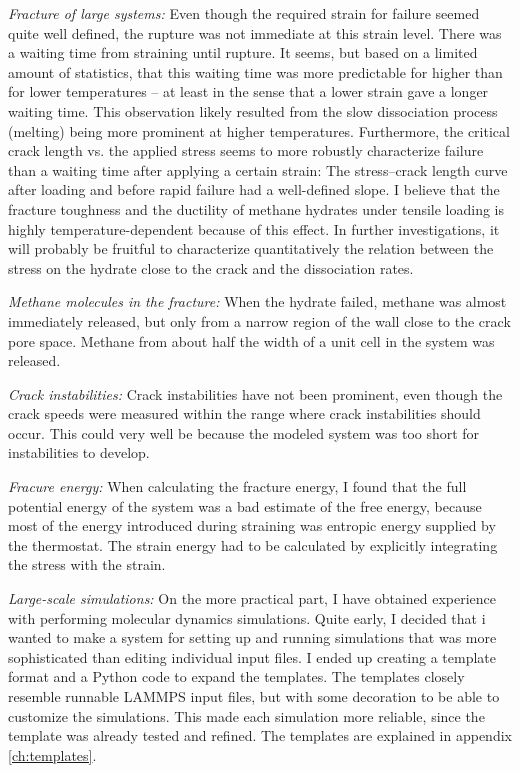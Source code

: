 \textit{Fracture of large systems:} Even though the required strain for failure seemed quite well defined, the rupture was not immediate at this strain level. There was a waiting time from straining until rupture. It seems, but based on a limited amount of statistics, that this waiting time was more predictable for higher than for lower temperatures -- at least in the sense that a lower strain gave a longer waiting time. This observation likely resulted from the slow dissociation process (melting) being more prominent at higher temperatures.  Furthermore, the critical crack length vs. the applied stress seems to more robustly characterize failure than a waiting time after applying a certain strain: The stress--crack length curve after loading and before rapid failure had a well-defined slope. I believe that the fracture toughness and the ductility of methane hydrates under tensile loading is highly temperature-dependent because of this effect. In further investigations, it will probably be fruitful to characterize quantitatively the relation between the stress on the hydrate close to the crack and the dissociation rates. 

\textit{Methane molecules in the fracture:} When the hydrate failed, methane was almost immediately released, but only from a narrow region of the wall close to the crack pore space. Methane from about half the width of a unit cell in the system was released.

\textit{Crack instabilities:} Crack instabilities have not been prominent, even though the crack speeds were measured within the range where crack instabilities should occur. This could very well be because the modeled system was too short for instabilities to develop.

\textit{Fracure energy:} When calculating the fracture energy, I found that the full potential energy of the system was a bad estimate of the free energy, because most of the energy introduced during straining was entropic energy supplied by the thermostat. The strain energy had to be calculated by explicitly integrating the stress with the strain. 

\textit{Large-scale simulations:} On the more practical part, I have obtained experience with performing molecular dynamics simulations. Quite early, I decided that i wanted to make a system for setting up and running simulations that was more sophisticated than editing individual input files. I ended up creating a template format and a Python code to expand the templates. The templates closely resemble runnable LAMMPS input files, but with some decoration to be able to customize the simulations. This made each simulation more reliable, since the template was already tested and refined. The templates are explained in appendix \ref{ch:templates}.


